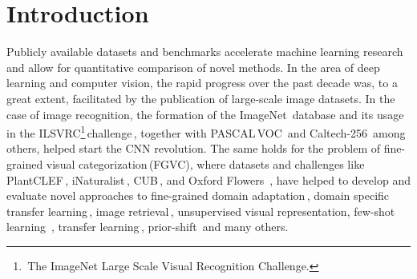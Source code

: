 \documentclass[10pt,twocolumn,letterpaper]{article}
\begin{document}
\section{Introduction}
Publicly available datasets and benchmarks accelerate machine learning research and allow for quantitative comparison of novel methods. In the area of deep learning and computer vision, the rapid progress over the past decade was, to a great extent, facilitated by the publication of large-scale image datasets. In the case of image recognition, the formation of the ImageNet\,\cite{imagenet} database and its usage in the ILSVRC\footnote{\,The ImageNet Large Scale Visual Recognition Challenge.}\,challenge\,\cite{ILSVRC15}, together with PASCAL\,VOC\,\cite{voc} and Caltech-256\,\cite{griffin2007caltech} among others, helped start the CNN revolution. The same holds for the problem of fine-grained visual categorization\,(FGVC), where datasets and challenges like PlantCLEF\,\cite{plantclef2016, plantclef2017, plantclef2015}, iNaturalist\,\cite{inaturalist2017}, CUB\,\cite{dataset-CUBS}, and Oxford Flowers \,\cite{dataset-flower}, have helped to develop and evaluate novel approaches to fine-grained domain adaptation\,\cite{domain_adap}, domain specific transfer learning\,\cite{transfer_learning}, image retrieval\,\cite{ft_imagenet_3, sohn2016improved, zhai2019classification}, unsupervised visual representation, few-shot learning \,\cite{wertheimer2019few}, transfer learning\,\cite{transfer_learning}, prior-shift\,\cite{sulc2018improving} and many others.
\end{document}

